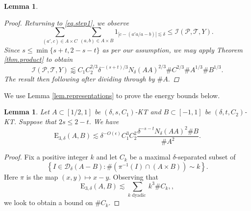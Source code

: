 \documentclass[12pt]{amsart}
\newtheorem{lemma}[theorem]{Lemma}
\newcounter{stepctr}
\newif\ifinsteppage
\newenvironment{steps}{%
	\setcounter{stepctr}{0}%
	\insteppagefalse
}{%
	\par\bigskip
}
\newcommand{\cP}{\mathcal{P}}
\newcommand{\cT}{\mathcal{T}}
\newcommand{\cI}{\mathcal{I}}
\newcommand{\1}{\mathbf{1}}
\newcommand{\de}{\delta}
\newcommand{\cn}[1]{N_\de({#1})}
\begin{document}
\begin{steps}
\begin{lemma}
\begin{proof}
			Returning to \eqref{eq.step1}, we observe
			\begin{equation}
			\sum_{(a',c) \in A \times C}\sum_{(a,b) \in A \times B} 1_{|c - (a'a/a-b)| \lesssim \delta}  \leq  \cI(\cP,\cT,Y).
			\end{equation}
      Since $s \leq \min\{s+t,2-s-t\}$ as per our assumption, we may apply Theorem \ref{thm.product} to obtain
      \begin{equation}\label{eq.energyincidences}
				\cI(\cP,\mathcal{T} ,Y) \lessapprox  C_1C_2^{2/3}\delta^{-(s+t)/3}\cn{AA}^{2/3}\#C^{2/3}\#A^{1/3}\#B^{1/3}.
			\end{equation}
			The result then following after dividing through by $\# A.$
		\end{proof}
	\end{lemma}
	
We use Lemma \ref{lem.representations} to prove the energy bounds below. 
\begin{lemma}\label{lem.energybounds}
  Let \(A \subset [1 / 2 , 1]\) be \((\delta,s,C_1)\)-KT and \(B \subset [-1,1]\) be \((\delta,t,C_2)\)-KT. Suppose that \(2s \leq 2 - t\). We have
\[
    \mathrm{E} _{3,\delta} (A,B) \lesssim  \delta^{- O(\epsilon)} C_1^{3}  C_2 ^{2}\frac{ \delta^{-s - t} N_{\delta} (AA)^{2} \# B}{\# A ^{2}} 
.\]
\end{lemma}

\begin{proof}
Fix a positive integer \(k\) and let \(C_k\) be a maximal \(\delta\)-separated subset of
\[
\left\{I \in \mathcal{D}_\delta\left(A-B\right): \#\left(\pi^{-1}(I) \cap\left(A \times B\right)\right) \sim k\right\} .
\]
Here \(\pi\) is the map \((x, y) \mapsto x-y\). Observing that
\[
\mathrm{E}_{3, \delta}(A,B) \lesssim \sum_{k \text { dyadic }} k^3 \# C_k,
,\]
we look to obtain a bound on \(\# C_k\). 


\end{proof}
\end{steps}
\end{document}
